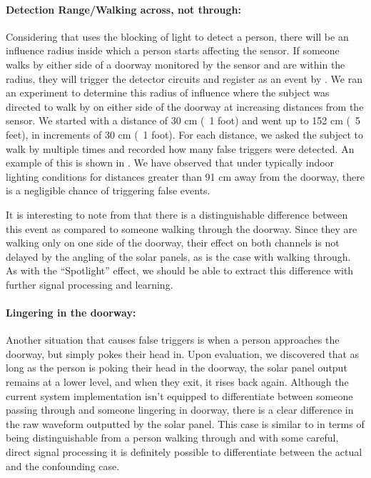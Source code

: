 \paragraph{Detection Range/Walking across, not through:}
\label{subsubsec:range}
Considering that \sysname uses the blocking of light to detect a person, there will be an influence radius inside which a person starts affecting the sensor.
If someone walks by either side of a doorway monitored by the \sysname sensor and are within the radius, they will trigger the detector circuits and register as an event by \sysname.
We ran an experiment to determine this radius of influence where the subject was directed to walk by on either side of the doorway at increasing distances from the sensor.
We started with a distance of 30 cm (~1 foot) and went up to 152 cm (~5 feet), in increments of 30 cm (~1 foot).
For each distance, we asked the subject to walk by multiple times and recorded how many false triggers were detected.
An example of this is shown in .
We have observed that under typically indoor lighting conditions for distances greater than 91 cm away from the doorway, there is a negligible chance of triggering false events.

It is interesting to note from  that there is a distinguishable difference between this event as compared to someone walking through the doorway.
Since they are walking only on one side of the doorway, their effect on both channels is not delayed by the angling of the solar panels, as is the case with walking through.
As with the ``Spotlight'' effect, we should be able to extract this difference with further signal processing and learning. %

\paragraph{Lingering in the doorway:}
Another situation that causes false triggers is when a person approaches the doorway, but simply pokes their head in.
Upon evaluation, we discovered that as long as the person is poking their head in the doorway, the solar panel output remains at a lower level, and when they exit, it rises back again.
Although the current system implementation isn't equipped to differentiate between someone passing through and someone lingering in doorway, there is a clear difference in the raw waveform outputted by the solar panel.
This case is similar to  in terms of being distinguishable from a person walking through and with some careful, direct signal processing it is definitely possible to differentiate between the actual and the confounding case.

